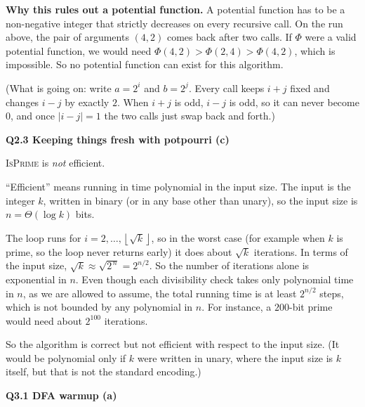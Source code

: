 \documentclass[11pt]{article}
\newcommand{\floor}[1]{\left\lfloor #1 \right\rfloor}
\newcommand{\algo}[1]{\textsc{#1}}
\newcommand{\qpage}[1]{\clearpage\noindent\textbf{\large #1}\par\medskip}
\begin{document}
\textbf{Why this rules out a potential function.}
A potential function has to be a non-negative integer that strictly decreases on every recursive call.
On the run above, the pair of arguments $(4,2)$ comes back after two calls.
If $\Phi$ were a valid potential function, we would need $\Phi(4,2) > \Phi(2,4) > \Phi(4,2)$, which is impossible.
So no potential function can exist for this algorithm.

(What is going on: write $a = 2^i$ and $b = 2^j$. Every call keeps $i + j$ fixed and changes $i - j$ by exactly $2$.
When $i + j$ is odd, $i - j$ is odd, so it can never become $0$, and once $|i-j| = 1$ the two calls just swap back and forth.)

\qpage{Q2.3 Keeping things fresh with potpourri (c)}

\algo{IsPrime} is \emph{not} efficient.

``Efficient'' means running in time polynomial in the input size.
The input is the integer $k$, written in binary (or in any base other than unary), so the input size is $n = \Theta(\log k)$ bits.

The loop runs for $i = 2, \dots, \floor{\sqrt k}$, so in the worst case (for example when $k$ is prime, so the loop never returns early) it does about $\sqrt{k}$ iterations.
In terms of the input size, $\sqrt{k} \approx \sqrt{2^{\,n}} = 2^{n/2}$.
So the number of iterations alone is exponential in $n$.
Even though each divisibility check takes only polynomial time in $n$, as we are allowed to assume, the total running time is at least $2^{n/2}$ steps, which is not bounded by any polynomial in $n$.
For instance, a $200$-bit prime would need about $2^{100}$ iterations.

So the algorithm is correct but not efficient with respect to the input size.
(It would be polynomial only if $k$ were written in unary, where the input size is $k$ itself, but that is not the standard encoding.)

\qpage{Q3.1 DFA warmup (a)}
\end{document}
